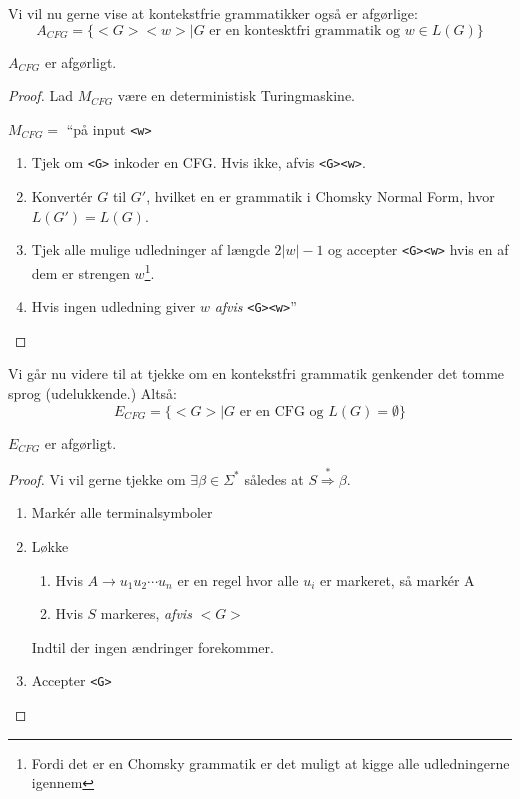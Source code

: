 Vi vil nu gerne vise at kontekstfrie grammatikker også er afgørlige:
\begin{equation*}
A_{CFG} = \{<G><w> \mid G \text{ er en kontesktfri grammatik og }w \in L(G)\}
\end{equation*}

\begin{theorem}
$A_{CFG}$ er afgørligt.
\end{theorem}

\begin{proof}
  Lad $M_{CFG}$ være en deterministisk Turingmaskine.

  $M_{CFG} = $ ``på input \texttt{<w>}
  \begin{enumerate}
    \item Tjek om \texttt{<G>} inkoder en CFG. Hvis ikke, afvis \texttt{<G><w>}.
    \item Konvertér $G$ til $G'$, hvilket en er grammatik i Chomsky Normal Form, hvor $L(G') = L(G)$.
    \item Tjek alle mulige udledninger af længde $2|w| -1$ og accepter \texttt{<G><w>} hvis en af dem er strengen $w$\footnote{Fordi det er en Chomsky grammatik er det muligt at kigge alle udledningerne igennem}.
    \item Hvis ingen udledning giver $w$ \textit{afvis} \texttt{<G><w>}''
  \end{enumerate}
\end{proof}

Vi går nu videre til at tjekke om en kontekstfri grammatik genkender det tomme sprog (udelukkende.) Altså:
\begin{equation*}
E_{CFG} = \{<G> \mid G \text{ er en CFG og }L(G) = \emptyset\}
\end{equation*}

\begin{theorem}
$E_{CFG}$ er afgørligt.
\end{theorem}

\begin{proof}
  Vi vil gerne tjekke om $\exists \beta \in \Sigma^{*}$ således at $S \stackrel{*}{\Rightarrow} \beta$.
  \begin{enumerate}
    \item Markér alle terminalsymboler
    \item Løkke
          \begin{enumerate}
            \item Hvis $A \rightarrow u_{1}u_{2} \cdots u_{n}$ er en regel hvor alle $u_i$ er markeret, så markér A
            \item Hvis $S$ markeres, \textit{afvis} $<G>$
          \end{enumerate}
          Indtil der ingen ændringer forekommer.

    \item Accepter \texttt{<G>}
  \end{enumerate}
\end{proof}

